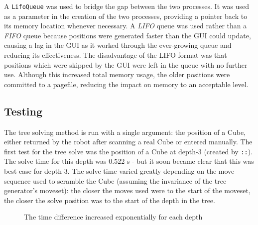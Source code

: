 \documentclass{report}
\newcommand{\tit}[1]{\textit{#1}}
\newcommand{\movesequence}[1]{\uppercase{\texttt{:\formatmoves{#1}:}}}
\newcommand{\depth}[1]{depth-#1}
\begin{document}
    A \lstinline|LifoQueue| was used to bridge the gap between the two processes. It was used as a parameter in the creation of the two processes, providing a pointer back to its memory location whenever necessary. A \tit{LIFO} queue was used rather than a \tit{FIFO} queue because positions were generated faster than the GUI could update, causing a lag in the GUI as it worked through the ever-growing queue and reducing its effectiveness. The disadvantage of the LIFO format was that positions which were skipped by the GUI were left in the queue with no further use. Although this increased total memory usage, the older positions were committed to a pagefile, reducing the impact on memory to an acceptable level.
    
    \subsection{Testing}

	The tree solving method is run with a single argument: the position of a Cube, either returned by the robot after scanning a real Cube or entered manually. The first test for the tree solve was the position of a Cube at \depth{3} (created by \movesequence{l'd'u@}). The solve time for this depth was 0.522 \si{\second} - but it soon became clear that this was best case for \depth{3}. The solve time varied greatly depending on the move sequence used to scramble the Cube (assuming the invariance of the tree generator's moveset): the closer the moves used were to the start of the moveset, the closer the solve position was to the start of the depth in the tree.
    
   	\begin{figure}[H]
    	\centering
   		\caption{The time difference increased exponentially for each depth}
   		\label{fig:treeSolveGraph}
    \end{figure}
    
\end{document}
